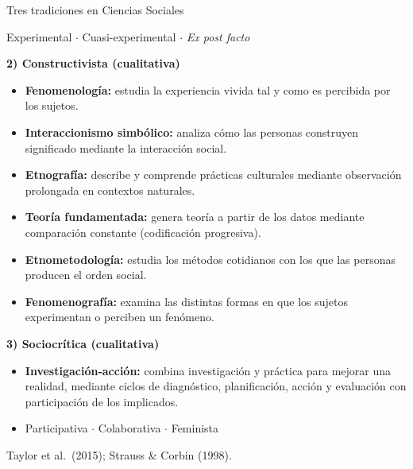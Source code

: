 \documentclass[aspectratio=169,8pt]{beamer}
\begin{document}
\begin{frame}{Tres tradiciones en Ciencias Sociales}
  \scriptsize
  \begin{tcolorbox}[formulabox,title=1) Emp\'irico-anal\'itica (cuantitativa)]
    Experimental \;$\cdot$\; Cuasi-experimental \;$\cdot$\; \emph{Ex post facto}
  \end{tcolorbox}
  \vspace{0.35em}
  \begin{tcolorbox}[tealbox]
    \textbf{2) Constructivista (cualitativa)}\\[2pt]
    \begin{itemize}
      \item \textbf{Fenomenolog\'ia:} estudia la experiencia vivida tal y como es percibida por los sujetos.
      \item \textbf{Interaccionismo simb\'olico:} analiza c\'omo las personas construyen significado mediante la interacci\'on social.
      \item \textbf{Etnograf\'ia:} describe y comprende pr\'acticas culturales mediante observaci\'on prolongada en contextos naturales.
      \item \textbf{Teor\'ia fundamentada:} genera teor\'ia a partir de los datos mediante comparaci\'on constante (codificaci\'on progresiva).
      \item \textbf{Etnometodolog\'ia:} estudia los m\'etodos cotidianos con los que las personas producen el orden social.
      \item \textbf{Fenomenograf\'ia:} examina las distintas formas en que los sujetos experimentan o perciben un fen\'omeno.
    \end{itemize}
  \end{tcolorbox}
  \vspace{0.35em}
  \begin{tcolorbox}[amberbox]
    \textbf{3) Sociocr\'itica (cualitativa)}\\[2pt]
    \begin{itemize}
      \item \textbf{Investigaci\'on-acci\'on:} combina investigaci\'on y pr\'actica para mejorar una realidad, mediante ciclos de diagn\'ostico, planificaci\'on, acci\'on y evaluaci\'on con participaci\'on de los implicados.
      \item Participativa \;$\cdot$\; Colaborativa \;$\cdot$\; Feminista
    \end{itemize}
  \end{tcolorbox}
  \vspace{0.35em}
  {\tiny\color{neutral}Taylor et al.\ (2015); Strauss \& Corbin (1998).}
\end{frame}
\end{document}
